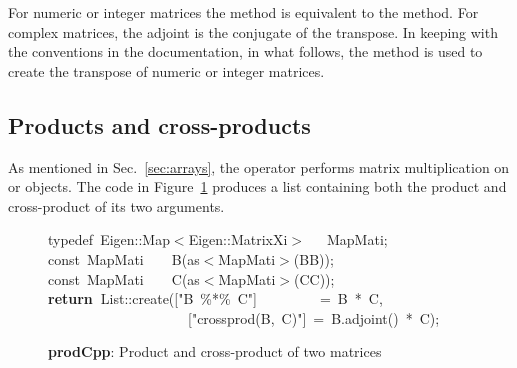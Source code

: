 \documentclass[shortnames,article]{jss}
\newcommand{\hlstd}[1]{\textcolor[rgb]{0,0,0}{#1}}
\newcommand{\hlopt}[1]{\textcolor[rgb]{0,0,0}{#1}}
\newcommand{\hlstr}[1]{\textcolor[rgb]{0.90,0.15,0.15}{#1}}
\newcommand{\hlkwa}[1]{\textcolor[rgb]{0.61,0.13,0.93}{\bf{#1}}}
\newcommand{\hlkwb}[1]{\textcolor[rgb]{0.13,0.54,0.13}{#1}}
\newcommand{\hlkwc}[1]{\textcolor[rgb]{0,0,1}{#1}}
\newcommand{\hlkwd}[1]{\textcolor[rgb]{0,0,0}{#1}}
\begin{document}
For numeric or integer matrices the  method is
equivalent to the  method.  For complex matrices, the
adjoint is the conjugate of the transpose.  In keeping with the
conventions in the  documentation, in what follows,
the  method is used to create the transpose of numeric or
integer matrices.


\subsection{Products and cross-products}
\label{sec:products}

As mentioned in Sec.~\ref{sec:arrays}, the  operator
performs matrix multiplication on  or
 objects. The  code in
Figure~\ref{prod} produces a list containing both the product and
cross-product of its two arguments.

\begin{figure}[htb]
  \noindent
  \ttfamily
  \hlstd{}\hlkwc{typedef\ }\hlstd{Eigen}\hlopt{::}\hlstd{Map}\hlopt{$<$}\hlstd{Eigen}\hlopt{::}\hlstd{MatrixXi}\hlopt{$>$}\hlstd{\ \ \ }\hlopt{}\hlstd{MapMati}\hlopt{;}\hspace*{\fill}\\
  \hlstd{}\hlkwb{const\ }\hlstd{MapMati}\hlstd{\ \ \ \ }\hlstd{}\hlkwd{B}\hlstd{}\hlopt{(}\hlstd{as}\hlopt{$<$}\hlstd{MapMati}\hlopt{$>$(}\hlstd{BB}\hlopt{));}\hspace*{\fill}\\
  \hlstd{}\hlkwb{const\ }\hlstd{MapMati}\hlstd{\ \ \ \ }\hlstd{}\hlkwd{C}\hlstd{}\hlopt{(}\hlstd{as}\hlopt{$<$}\hlstd{MapMati}\hlopt{$>$(}\hlstd{CC}\hlopt{));}\hspace*{\fill}\\
  \hlstd{}\hlkwa{return\ }\hlstd{List}\hlopt{::}\hlstd{}\hlkwd{create}\hlstd{}\hlopt{(}\hlstd{\textunderscore }\hlopt{{[}}\hlstd{}\hlstr{"B\ \%{*}\%\ C"}\hlstd{}\hlopt{{]}}\hlstd{\ \ \ \ \ \ \ \ \ }\hlopt{=\ }\hlstd{B\ }\hlopt{{*}\ }\hlstd{C}\hlopt{,}\hspace*{\fill}\\
  \hlstd{}\hlstd{\ \ \ \ \ \ \ \ \ \ \ \ \ \ \ \ \ \ \ \ }\hlstd{\textunderscore }\hlopt{{[}}\hlstd{}\hlstr{"crossprod(B,\ C)"}\hlstd{}\hlopt{{]}\ =\ }\hlstd{B}\hlopt{.}\hlstd{}\hlkwd{adjoint}\hlstd{}\hlopt{()\ {*}\ }\hlstd{C}\hlopt{);}\hlstd{}\hspace*{\fill}\\
  \mbox{}
  \normalfont
  \normalsize
  \caption{\textbf{prodCpp}: Product and cross-product of two matrices}
  \label{prod}
\end{figure}
\end{document}
